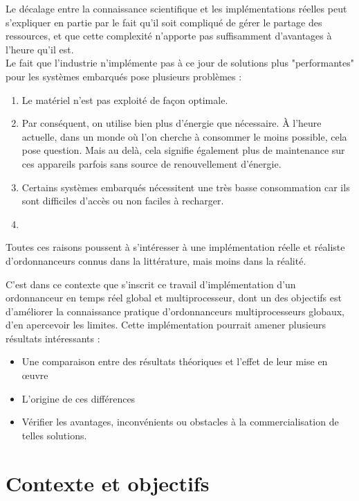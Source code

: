 \documentclass[11pt,a4paper,oneside]{report}
\begin{document}
Le décalage entre la connaissance scientifique et les implémentations réelles 
peut s'expliquer en partie par le fait qu'il soit compliqué de gérer le partage des ressources, 
et que cette complexité n'apporte pas suffisamment d'avantages à l'heure qu'il est.\\

Le fait que l'industrie n'implémente pas à ce jour de solutions plus "performantes" 
pour les systèmes embarqués pose plusieurs problèmes :
\begin{enumerate}
	\item Le matériel n'est pas exploité de façon optimale.
	\item Par conséquent, on utilise bien plus d'énergie que nécessaire. 
	À l'heure actuelle, dans un monde où l'on cherche à consommer le moins possible, 
	cela pose question. Mais au delà, cela signifie également plus de maintenance 
	sur ces appareils parfois sans source de renouvellement d'énergie.
	\item Certains systèmes embarqués nécessitent une très basse consommation car 
	ils sont difficiles d'accès ou non faciles à recharger.
	\item 
\end{enumerate}

Toutes ces raisons poussent à s'intéresser à une implémentation réelle et réaliste 
d'ordonnanceurs connus dans la littérature, mais moins dans la réalité.

C'est dans ce contexte que s'inscrit ce travail d'implémentation d'un ordonnanceur en temps réel 
global et multiprocesseur, dont un des objectifs est d'améliorer la connaissance pratique 
d'ordonnanceurs multiprocesseurs globaux, d'en apercevoir les limites. 
Cette implémentation pourrait amener plusieurs résultats intéressants : \\
\begin{itemize}
	\item Une comparaison entre des résultats théoriques et l'effet de leur mise 
	en \oe{}uvre
	\item L'origine de ces différences
	\item Vérifier les avantages, inconvénients ou obstacles à la 
	commercialisation de telles solutions.
\end{itemize}

\section{Contexte et objectifs}
\end{document}
